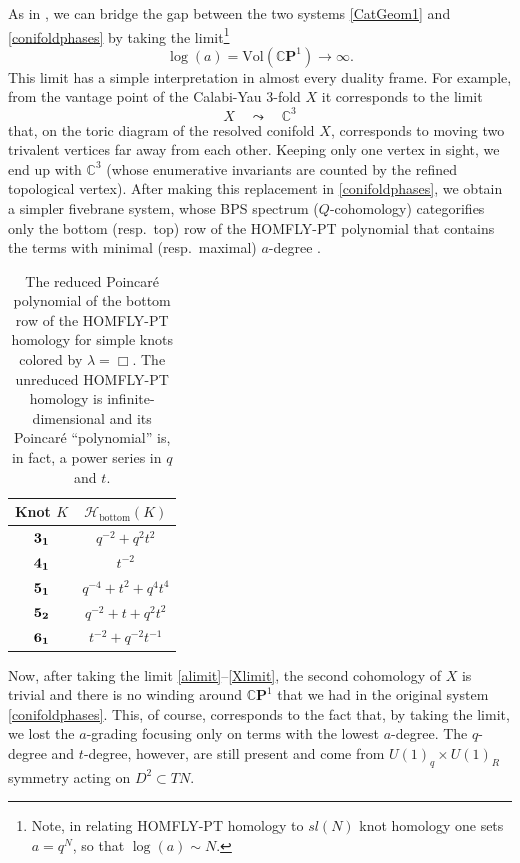 \documentclass[hyper,letterpaper]{JHEP3}
\newcommand{\be}{\begin{equation}}
\newcommand{\ee}{\end{equation}}
\newcommand{\C}{{\mathbb C}}
\newcommand{\cp}{{\mathbb{C}}{\mathbf{P}}}
\def\CH{{\mathcal H}}
\begin{document}
As in \cite{Gorsky:2013jxa}, we can bridge the gap between the two systems \eqref{CatGeom1} and \eqref{conifoldphases}
by taking the limit\footnote{Note, in relating HOMFLY-PT homology to $sl(N)$ knot homology one sets $a = q^N$, so that $\log (a) \sim N$.}
\be
\log (a) = \text{Vol} (\cp^1) \to \infty.
\label{alimit}
\ee
This limit has a simple interpretation in almost every duality frame. For example, from the vantage point of the Calabi-Yau 3-fold $X$
it corresponds to the limit
\be
X \quad \leadsto \quad \C^3
\label{Xlimit}
\ee
that, on the toric diagram of the resolved conifold $X$, corresponds to moving two trivalent vertices far away from each other.
Keeping only one vertex in sight, we end up with $\C^3$ (whose enumerative invariants are counted by the refined topological vertex).
After making this replacement in \eqref{conifoldphases}, we obtain a simpler fivebrane system, whose BPS spectrum ($Q$-cohomology)
categorifies only the bottom (resp.~top) row of the HOMFLY-PT polynomial that contains the terms with minimal (resp.~maximal)
$a$-degree \cite{Gorsky:2013jxa}.

\begin{table}[htb]
\centering
\renewcommand{\arraystretch}{1.3}
\begin{tabular}{|@{\quad}c@{\quad}|@{\quad}c@{\quad}| }
\hline Knot $K$ & $\CH_{\text{bottom}} (K)$
\\
\hline
\hline ${\bf 3_1}$ & $q^{-2} + q^2 t^2$ \\
\hline ${\bf 4_1}$ & $t^{-2}$ \\
\hline ${\bf 5_1}$ & $q^{-4} + t^2 + q^4 t^4$ \\
\hline ${\bf 5_2}$ & $q^{-2} + t + q^2 t^2$ \\
\hline ${\bf 6_1}$ & $t^{-2} + q^{-2} t^{-1}$ \\
\hline
\end{tabular}
\caption{The reduced Poincar\'e polynomial of the bottom row of the HOMFLY-PT homology for simple knots colored by $\lambda = \Box$. The unreduced HOMFLY-PT homology is infinite-dimensional and its Poincar\'e ``polynomial'' is, in fact, a power series in $q$ and $t$.}
\label{tab:examples}
\end{table}

Now, after taking the limit \eqref{alimit}--\eqref{Xlimit}, the second cohomology of $X$ is trivial and there is no winding
around $\cp^1$ that we had in the original system \eqref{conifoldphases}. This, of course, corresponds to the fact that, by taking the limit,
we lost the $a$-grading focusing only on terms with the lowest $a$-degree.
The $q$-degree and $t$-degree, however, are still present and come from $U(1)_q \times U(1)_R$ symmetry acting on $D^2 \subset TN$.
\end{document}
